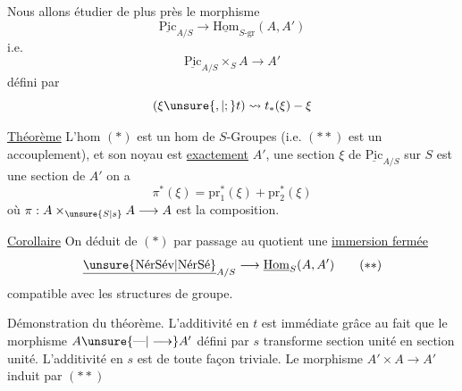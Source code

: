 Nous allons étudier de plus près le morphisme
\[
\underline{\mathrm{Pic}}_{A/S}\longrightarrow\underline{\mathrm{Hom}}_{S\text{-gr}}(A,A')\tag*{$(*)$}
\]
i.e.
\[
\underline{\mathrm{Pic}}_{A/S}\times_S A\longrightarrow A'\tag*{$(**)$}
\]
défini par
\[
(\xi\unsure{,|;}t)\rightsquigarrow t_*(\xi)-\xi
\]

\noindent\llap{\smash{\rule[-3.6ex]{0.4pt}{4ex}}\quad}\uline{Théorème} L'hom $(*)$ est un hom de $S$-Groupes  (i.e. $(**)$ est un accouplement), et son noyau est \uline{exactement} $A'$,    une section $\xi$ de $\underline{\mathrm{Pic}}_{A/S}$ sur $S$ est une  section de $A'$  on a
\[
\boxed{\pi^*(\xi)=\mathrm{pr}_1^*(\xi)+\mathrm{pr}_2^*(\xi)}
\]
où $\pi:A\times_{\unsure{S|s}} A\longrightarrow A$ est la  composition.

\noindent\llap{\smash{\rule[-1.8ex]{0.4pt}{2ex}}\quad}\uline{Corollaire} On déduit de $(*)$ par passage au quotient une \uline{immersion fermée}
\[
\underline{\text{\unsure{NérSév|NérSé}}}_{A/S}\longrightarrow\underline{\mathrm{Hom}}_S(A,A')\tag*{$(**)$}
\]
compatible avec les structures de groupe.

Démonstration du théorème. L'additivité en $t$ est immédiate grâce au fait que le morphisme $A\unsure{\text{---}|\longrightarrow}A'$ défini par $s$ transforme section unité en section unité. L'additivité en $s$ est de toute façon triviale. Le morphisme $A'\times A\longrightarrow A'$ induit par $(**)$

